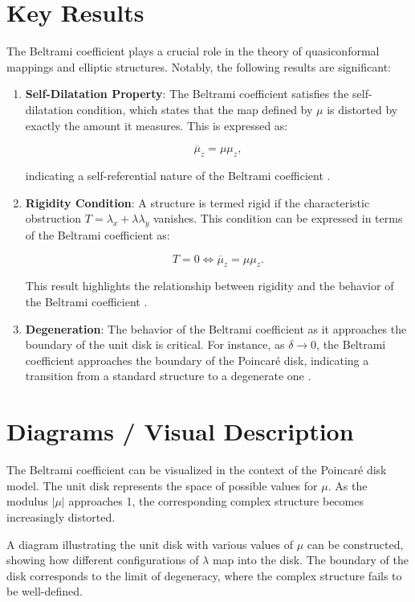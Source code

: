 \documentclass[11pt,a4paper]{article}
\begin{document}
\section{Key Results}
The Beltrami coefficient plays a crucial role in the theory of quasiconformal mappings and elliptic structures. Notably, the following results are significant:

\begin{enumerate}
\item \textbf{Self-Dilatation Property}: The Beltrami coefficient satisfies the self-dilatation condition, which states that the map defined by $\mu$ is distorted by exactly the amount it measures. This is expressed as:

\[
\overline{\mu}_z = \mu \mu_z,
\]

indicating a self-referential nature of the Beltrami coefficient \cite{2601.19274v4}.

\item \textbf{Rigidity Condition}: A structure is termed rigid if the characteristic obstruction $T = \lambda_x + \lambda \lambda_y$ vanishes. This condition can be expressed in terms of the Beltrami coefficient as:

\[
T = 0 \iff \overline{\mu}_z = \mu \mu_z.
\]

This result highlights the relationship between rigidity and the behavior of the Beltrami coefficient \cite{2602.19251v1}.

\item \textbf{Degeneration}: The behavior of the Beltrami coefficient as it approaches the boundary of the unit disk is critical. For instance, as $\delta \to 0$, the Beltrami coefficient approaches the boundary of the Poincar\'e disk, indicating a transition from a standard structure to a degenerate one \cite{2601.19274v4}.
\end{enumerate}

\section{Diagrams / Visual Description}
The Beltrami coefficient can be visualized in the context of the Poincar\'e disk model. The unit disk represents the space of possible values for $\mu$. As the modulus $|\mu|$ approaches 1, the corresponding complex structure becomes increasingly distorted.

A diagram illustrating the unit disk with various values of $\mu$ can be constructed, showing how different configurations of $\lambda$ map into the disk. The boundary of the disk corresponds to the limit of degeneracy, where the complex structure fails to be well-defined.
\end{document}
